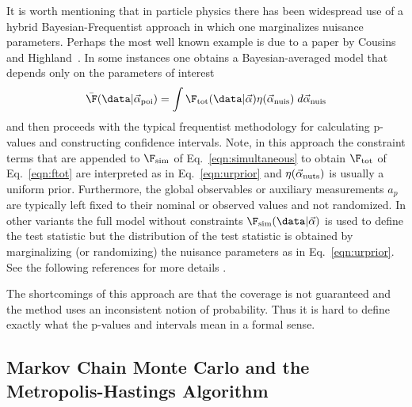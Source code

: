 It is worth mentioning that in particle physics there has been widespread use of a hybrid Bayesian-Frequentist approach in which one marginalizes nuisance parameters.  Perhaps the most well known example is due to a paper by Cousins and Highland~\cite{CousinsHighland:1991qz}.  In some instances one obtains a Bayesian-averaged model that depends only on the parameters of interest
\begin{equation}
\bar{\F}(\data | \vec\alpha_{\rm poi}) = \int  \F_{\rm tot}(\data | \vec\alpha) \eta(\vec\alpha_{\rm nuis}) \; d\vec\alpha_{\rm nuis}
\end{equation}
and then proceeds with the typical frequentist methodology for calculating p-values and constructing confidence intervals. Note, in this approach the constraint terms that are appended to $\F_{\rm sim}$ of Eq.~\ref{eqn:simultaneous} to obtain $\F_{\rm tot}$ of Eq.~\ref{eqn:ftot} are interpreted as in Eq.~\ref{eqn:urprior} and $\eta(\vec\alpha_{\rm nuts})$ is usually a uniform prior.  Furthermore, the global observables or auxiliary measurements $a_p$ are typically left fixed to their nominal or observed values and not randomized.
In other variants the full model without constraints $\F_{\rm sim}(\data | \vec\alpha)$ is used to define the test statistic but the distribution of the test statistic is obtained by marginalizing (or randomizing) the nuisance parameters as in Eq.~\ref{eqn:urprior}.  See the following references for more details  \cite{Conrad:2005zm,Tegenfeldt:2004dk,Conrad:2002ur,Conrad:2002kn,Rolke:2004mj,PhysRevD.67.118101,Demortier:2007zz,Cousins:2008zz}.  


The shortcomings of this approach are that the coverage is not guaranteed and the method uses an inconsistent notion of probability.  Thus it is hard to define exactly what the p-values and intervals mean in a formal sense.


\subsection{Markov Chain Monte Carlo and the Metropolis-Hastings Algorithm}


